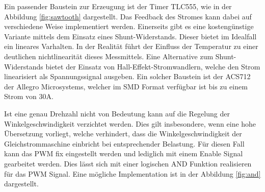 Ein passender Baustein zur Erzeugung ist der Timer TLC555, wie in der
Abbildung \ref{fig:sawtooth} dargestellt. Das Feedback des Stromes kann
dabei auf verschiedene Weise implementiert werden. Einerseits gibt es eine
kostengünstige Variante mittels dem Einsatz eines Shunt-Widerstands. Dieser
bietet im Idealfall ein lineares Varhalten. In der Realität führt der
Einfluss der Temperatur zu einer deutlichen nichtlinearität dieses
Messmittels. Eine Alternative zum Shunt-Widerstands bietet der Einsatz von
Hall-Effekt-Stromwandlern, welche den Strom linearisiert als Spannungssignal
ausgeben. Ein solcher Baustein ist der ACS712 der Allegro Microsystems,
welcher im SMD Format verfügbar ist bis zu einem Strom von 30A.

Ist eine genau Drehzahl nicht von Bedeutung kann auf die Regelung der
Winkelgeschwindigkeit verzichtet werden. Dies gilt insbesondere, wenn eine
hohe Übersetzung vorliegt, welche verhindert, dass die Winkelgeschwindigkeit
der Gleichstrommaschine einbricht bei entsprechender Belastung. Für diesen
Fall kann das PWM fix eingestellt werden und lediglich mit einem Enable
Signal gearbeitet werden. Dies lässt sich mit einer logischen AND Funktion
realisieren für das PWM Signal. Eine mögliche Implementation ist in der
Abbildung \ref{fig:and} dargestellt.

